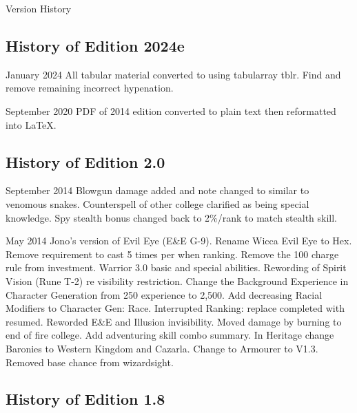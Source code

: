 \begin{Chapter}{Version History}

\subsection{History of Edition 2024e}

\begin{Description}

\item[January 2024] All tabular material converted to using
  tabularray tblr.  Find and remove remaining incorrect hypenation.
  
\item[September 2020] PDF of 2014 edition converted to plain
text then reformatted into \LaTeX.

\end{Description}

\subsection{History of Edition 2.0}

\begin{Description}

\item[September 2014] Blowgun damage added and note changed to similar
  to venomous snakes.  Counterspell of other college clarified as
  being special knowledge.  Spy stealth bonus changed back to 2\%/rank
  to match stealth skill.

\item[May 2014] Jono's version of Evil Eye (E\&E G-9).  Rename Wicca
  Evil Eye to Hex.  Remove requirement to cast 5 times per when
  ranking.  Remove the 100 charge rule from investment.  Warrior 3.0
  basic and special abilities.  Rewording of Spirit Vision (Rune T-2)
  re visibility restriction.  Change the Background Experience in
  Character Generation from 250 experience to 2,500.  Add decreasing
  Racial Modifiers to Character Gen: Race.  Interrupted Ranking:
  replace completed with resumed.  Reworded E\&E and Illusion
  invisibility.  Moved damage by burning to end of fire college.  Add
  adventuring skill combo summary.  In Heritage change Baronies to
  Western Kingdom and Cazarla.  Change to Armourer to V1.3.  Removed
  base chance from wizardsight.

\end{Description}

\subsection{History of Edition 1.8}


\end{Chapter}

